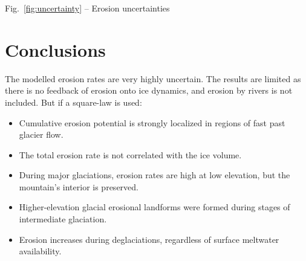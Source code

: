 \documentclass[utf8]{article}
\begin{document}
    Fig.~\ref{fig:uncertainty} -- Erosion uncertainties

\section{Conclusions}

    The modelled erosion rates are very highly uncertain. The results are
    limited as there is no feedback of erosion onto ice dynamics, and
    erosion by rivers is not included. But if a square-law is used:
    \begin{itemize}
      \item Cumulative erosion potential is strongly localized in regions
        of fast past glacier flow.
      \item The total erosion rate is not correlated with the ice volume.
      \item During major glaciations, erosion rates are high at low elevation,
        but the mountain's interior is preserved.
      \item Higher-elevation glacial erosional landforms were formed during
        stages of intermediate glaciation.
      \item Erosion increases during deglaciations, regardless of surface
        meltwater availability.
    \end{itemize}


\end{document}
